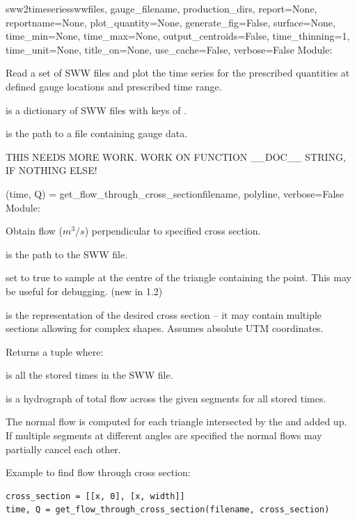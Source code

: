 \documentclass{manual}
\begin{document}
\begin{funcdesc}{sww2timeseries}{swwfiles,
                                 gauge_filename,
                                 production_dirs,
                                 report=None,
                                 reportname=None,
                                 plot_quantity=None,
                                 generate_fig=False,
                                 surface=None,
                                 time_min=None,
                                 time_max=None,
                                 output_centroids=False,
                                 time_thinning=1,
                                 time_unit=None,
                                 title_on=None,
                                 use_cache=False,
                                 verbose=False}
Module: 

Read a set of SWW files and plot the time series for the prescribed quantities
at defined gauge locations and prescribed time range.

 is a dictionary of SWW files with keys of .

 is the path to a file containing gauge data.

THIS NEEDS MORE WORK.  WORK ON FUNCTION __DOC__ STRING, IF NOTHING ELSE!
\end{funcdesc}

\begin{funcdesc}{(time, Q) = get_flow_through_cross_section}{filename, polyline, verbose=False}
Module: 

Obtain flow ($m^3/s$) perpendicular to specified cross section.

 is the path to the SWW file.

 set to true to sample at the centre of the triangle containing the point.
This may be useful for debugging. (new in 1.2)

 is the representation of the desired cross section -- it may contain
multiple sections allowing for complex shapes. Assumes absolute UTM coordinates.

Returns a tuple  where:

 is all the stored times in the SWW file.

 is a hydrograph of total flow across the given segments for all stored times.

The normal flow is computed for each triangle intersected by the  and
added up.  If multiple segments at different angles are specified the normal flows
may partially cancel each other.

Example to find flow through cross section:

\begin{verbatim}
cross_section = [[x, 0], [x, width]]
time, Q = get_flow_through_cross_section(filename, cross_section)
\end{verbatim}
\end{funcdesc}
\end{document}
